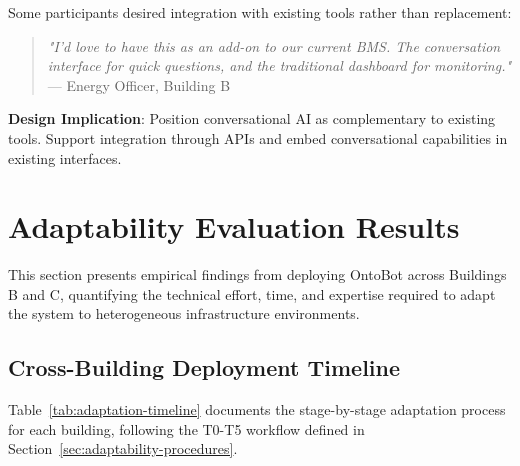 \documentclass[acmlarge]{acmart}
\begin{document}
Some participants desired integration with existing tools rather than replacement:

\begin{quote}
\textit{"I'd love to have this as an add-on to our current BMS. The conversation interface for quick questions, and the traditional dashboard for monitoring."} — Energy Officer, Building B
\end{quote}

\textbf{Design Implication}: Position conversational AI as complementary to existing tools. Support integration through APIs and embed conversational capabilities in existing interfaces.

\section{Adaptability Evaluation Results}

This section presents empirical findings from deploying OntoBot across Buildings B and C, quantifying the technical effort, time, and expertise required to adapt the system to heterogeneous infrastructure environments.

\subsection{Cross-Building Deployment Timeline}

Table~\ref{tab:adaptation-timeline} documents the stage-by-stage adaptation process for each building, following the T0-T5 workflow defined in Section~\ref{sec:adaptability-procedures}.
\end{document}
